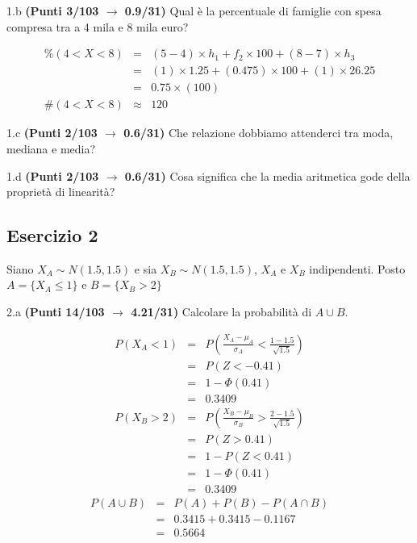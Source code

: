 \documentclass[
  11pt,
]{book}
\theoremstyle{mytheoremstyle}
\theoremstyle{mydefstyle}
\newenvironment{sol}
  {
  \begin{tcolorbox}[enhanced,breakable,arc=0.1mm,boxrule=1pt,colback=white,colframe=iblue,
  title=\bf \fontfamily{lmss}\selectfont \hspace{.5 cm} Soluzione,drop fuzzy shadow]

}{
\end{tcolorbox}
  }
\begin{document}
1.b \textbf{(Punti 3/103 \(\rightarrow\) 0.9/31)} Qual è la percentuale di famiglie con spesa compresa tra a 4 mila e 8 mila euro?

\begin{sol}
\begin{eqnarray*} \%(4<X<8) &=& (5-4)\times h_{1}+ f_{ 2 }\times 100 + (8-7)\times h_{3}  \\ 
 &=& (1)\times 1.25+ ( 0.475 )\times 100 + (1)\times 26.25  \\ 
 &=&  0.75 \times(100)\\
     \#( 4 < X < 8 ) &\approx& 120 
         \end{eqnarray*}

\end{sol}

1.c \textbf{(Punti 2/103 \(\rightarrow\) 0.6/31)} Che relazione dobbiamo attenderci tra moda, mediana e media?

1.d \textbf{(Punti 2/103 \(\rightarrow\) 0.6/31)} Cosa significa che la media aritmetica gode della proprietà di linearità?

\subsection{Esercizio 2}\label{esercizio-2-26}

Siano \(X_A\sim N(1.5,1.5)\) e sia \(X_B\sim N(1.5,1.5)\), \(X_A\) e \(X_B\) indipendenti. Posto \(A=\{X_A\le 1\}\) e \(B=\{X_B>2\}\)

2.a \textbf{(Punti 14/103 \(\rightarrow\) 4.21/31)} Calcolare la probabilità di \(A\cup B\).

\begin{sol}
\begin{eqnarray*}
      P( X_A   <   1 ) 
        &=& P\left(  \frac { X_A  -  \mu_A }{ \sigma_A }  <  \frac { 1  -  1.5 }{\sqrt{ 1.5 }} \right)  \\
                 &=& P\left(  Z   <   -0.41 \right) \\    
                 &=&  1-\Phi( 0.41 ) \\ &=&  0.3409 
      \end{eqnarray*}\begin{eqnarray*}
      P( X_B   >   2 ) 
        &=& P\left(  \frac { X_B  -  \mu_B }{ \sigma_B }  >  \frac { 2  -  1.5 }{\sqrt{ 1.5 }} \right)  \\
                 &=& P\left(  Z   >   0.41 \right) \\    &=& 1-P(Z< 0.41 )\\ 
                 &=&  1-\Phi( 0.41 ) \\ &=&  0.3409 
      \end{eqnarray*}
\begin{eqnarray*}
  P(A\cup B) &=&  P(A)+P(B)-P(A\cap B)\\
  &=& 0.3415+0.3415-0.1167\\
  &=& 0.5664
\end{eqnarray*}

\end{sol}
\end{document}
